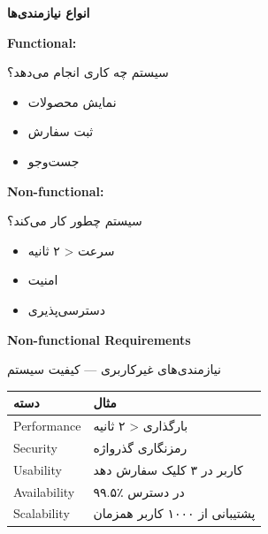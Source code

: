 \documentclass[14pt, a4paper, landscape]{extarticle}
\newcommand{\slide}[1]{%
    \newpage
    \begin{center}
    \begin{minipage}[t]{0.95\textwidth}
    \vspace{0.5cm}
    #1
    \vspace{0.5cm}
    \end{minipage}
    \end{center}
}
\newcommand{\slidetitle}[1]{%
    \begin{center}
        {\LARGE\bfseries\textcolor{primary}{#1}}
    \end{center}
    \vspace{0.5cm}
}
\newcommand{\myaccent}[1]{\textcolor{accent}{#1}}
\begin{document}
\slide{
    \slidetitle{انواع نیازمندی‌ها}
    \vspace{0.5cm}
    \begin{minipage}[t]{0.48\textwidth}
        {\large\bfseries\textcolor{primary}{Functional:}}
        \vspace{0.3cm}
        
        {\small سیستم چه کاری انجام می‌دهد؟}
        \vspace{0.3cm}
        \begin{itemize}[itemsep=0.3em]
            \item نمایش محصولات
            \item ثبت سفارش
            \item جست‌وجو
        \end{itemize}
    \end{minipage}
    \hfill
    \begin{minipage}[t]{0.48\textwidth}
        {\large\bfseries\myaccent{Non-functional:}}
        \vspace{0.3cm}
        
        {\small سیستم چطور کار می‌کند؟}
        \vspace{0.3cm}
        \begin{itemize}[itemsep=0.3em]
            \item سرعت < ۲ ثانیه
            \item امنیت
            \item دسترسی‌پذیری
        \end{itemize}
    \end{minipage}
}

\slide{
    \slidetitle{Non-functional Requirements}
    \vspace{0.5cm}
    {\large نیازمندی‌های غیرکاربری — کیفیت سیستم}
    \vspace{0.8cm}
    \begin{center}
        \begin{tabular}{ll}
            \toprule
            \textbf{دسته} & \textbf{مثال} \\
            \midrule
            Performance & بارگذاری < ۲ ثانیه \\
            \hline
            Security & رمزنگاری گذرواژه \\
            \hline
            Usability & کاربر در ۳ کلیک سفارش دهد \\
            \hline
            Availability & ۹۹.۵٪ در دسترس \\
            \hline
            Scalability & پشتیبانی از ۱۰۰۰ کاربر همزمان \\
            \bottomrule
        \end{tabular}
    \end{center}
}
\end{document}

